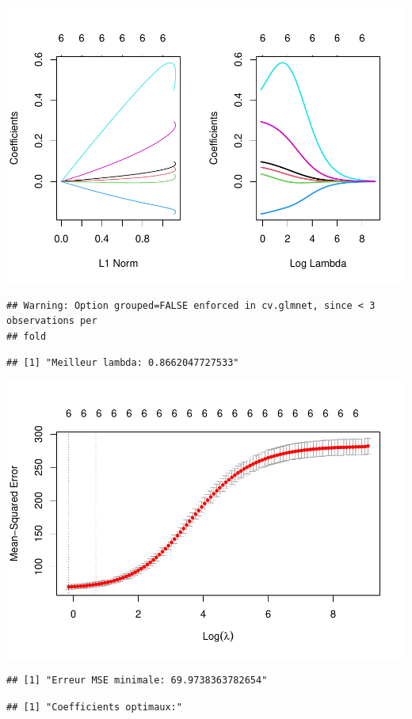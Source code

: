 \documentclass[
  12pt,
]{article}
\begin{document}
\includegraphics{rmd_final_files/figure-latex/unnamed-chunk-62-1.pdf}

\begin{verbatim}
## Warning: Option grouped=FALSE enforced in cv.glmnet, since < 3 observations per
## fold
\end{verbatim}

\begin{verbatim}
## [1] "Meilleur lambda: 0.8662047727533"
\end{verbatim}

\includegraphics{rmd_final_files/figure-latex/unnamed-chunk-62-2.pdf}

\begin{verbatim}
## [1] "Erreur MSE minimale: 69.9738363782654"
\end{verbatim}

\begin{verbatim}
## [1] "Coefficients optimaux:"
\end{verbatim}
\end{document}
